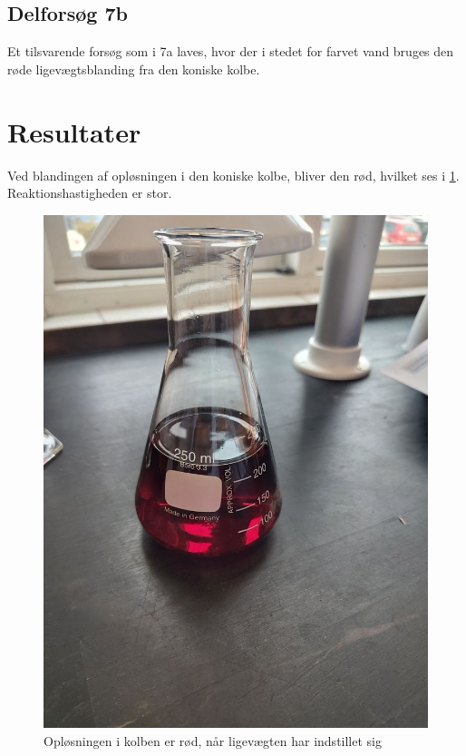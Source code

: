 \documentclass{report}
\begin{document}
\subsection*{Delforsøg 7b}
Et tilsvarende forsøg som i 7a laves, hvor der i stedet for farvet vand bruges den røde ligevægtsblanding fra den koniske kolbe.
\section*{Resultater}
Ved blandingen af opløsningen i den koniske kolbe, bliver den rød, hvilket ses i \cref{fig:kolbe}.
Reaktionshastigheden er stor.
\begin{figure}[H]
\begin{center}
  \includegraphics[scale=0.4]{konisk.jpeg}
\end{center}
\caption{Opløsningen i kolben er rød, når ligevægten har indstillet sig}
\label{fig:kolbe}
\end{figure}
\end{document}
